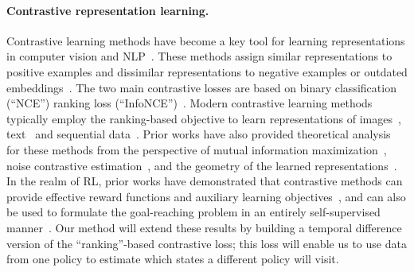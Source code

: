 \documentclass{article} %
\begin{document}
\paragraph{Contrastive representation learning.} Contrastive learning methods have become a key tool for learning representations in computer vision and NLP~\citep{chopra2005learning, schroff2015facenet, sohn2016improved, oh2016deep, wang2020understanding, oord2018representation, tschannen2019mutual, weinberger2009distance, he2022masked, radford2021learning, chen2020simple, tian2020contrastive, gao2021simcse}. These methods assign similar representations to positive examples and dissimilar representations to negative examples or outdated embeddings~\citep{grill2020bootstrap}.
The two main contrastive losses are based on binary classification (``NCE'') ranking loss (``InfoNCE'')~\citep{ma2018noise}. Modern contrastive learning methods typically employ the ranking-based objective to learn representations of images~\citep{chen2020simple, tian2020contrastive, henaff2020data, wu2018unsupervised}, text~\citep{logeswaran2018efficient, jia2021scaling, radford2021learning} and sequential data~\citep{nair2022r3m, sermanet2018time}.
Prior works have also provided theoretical analysis for these methods from the perspective of mutual information maximization~\citep{linsker1988self, poole2019variational}, noise contrastive estimation~\citep{gutmann2010noise, ma2018noise, tsai2020neural, arora2019theoretical}, and the geometry of the learned representations~\citep{wang2020understanding}. 
In the realm of RL, prior works have demonstrated that contrastive methods can provide effective reward functions and auxiliary learning objectives~\citep{laskin2020curl, laskin2020reinforcement, hansen2022bisimulation, choi2021variational, nair2020contextual, nair2018visual}, and can also be used to formulate the goal-reaching problem in an entirely self-supervised manner~\citep{ma2022vip, durugkar2021adversarial, eysenbach2020c, eysenbach2022contrastive}. 
Our method will extend these results by building a temporal difference version of the ``ranking''-based contrastive loss; this loss will enable us to use data from one policy to estimate which states a different policy will visit.
\end{document}
